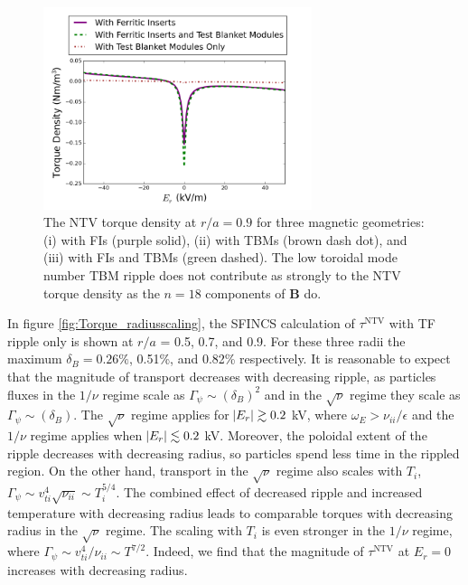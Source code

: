 \documentclass[aip, pop, preprint]{revtex4-1}
\numberwithin{figure}{section}
\numberwithin{equation}{section}
\begin{document}
\begin{figure}[h!]
\centering
\includegraphics[width=0.7\textwidth]{Torque_comparingTBMandFI.png}
\caption{\label{fig:Torque_comparingTBMandFI} The NTV torque density at $r/a = 0.9$ for three magnetic geometries: (i) with FIs (purple solid), (ii) with TBMs (brown dash dot), and (iii) with FIs and TBMs (green dashed). The low toroidal mode number TBM ripple does not contribute as strongly to the NTV torque density as the $n = 18$ components of $\bm{B}$ do.}
\end{figure}

In figure \ref{fig:Torque_radiusscaling}, the SFINCS calculation of $\tau^{\text{NTV}}$ with TF ripple only is shown at $r/a$ = 0.5, 0.7, and 0.9. For these three radii the maximum $\delta_B = 0.26\%$,  0.51\%, and 0.82\% respectively. It is reasonable to expect that the magnitude of transport decreases with decreasing ripple, as particles fluxes in the $1/\nu$ regime scale as $\Gamma_{\psi} \sim (\delta_B)^2$\cite{Shaing2003} and in the $\sqrt{\nu}$ regime they scale as $ \Gamma_{\psi}\sim (\delta_B)$.\cite{Shaing2008} The $\sqrt{\nu}$ regime applies for $\abs{E_r} \gtrsim 0.2$ kV, where $\omega_E > \nu_{ii}/\epsilon$ and the $1/\nu$ regime applies when $\abs{E_r} \lesssim 0.2$ kV. Moreover, the poloidal extent of the ripple decreases with decreasing radius, so particles spend less time in the rippled region. On the other hand, transport in the $\sqrt{\nu}$ regime also scales with $T_i$, $\Gamma_{\psi} \sim v_{ti}^4 \sqrt{\nu_{ii}} \sim T_i^{5/4}$. The combined effect of decreased ripple and increased temperature with decreasing radius leads to comparable torques with decreasing radius in the $\sqrt{\nu}$ regime. The scaling with $T_i$ is even stronger in the $1/\nu$ regime, where $\Gamma_{\psi} \sim v_{ti}^4/\nu_{ii} \sim T^{7/2}$. Indeed, we find that the magnitude of $\tau^{\text{NTV}}$ at $E_r = 0$ increases with decreasing radius. 
\end{document}
